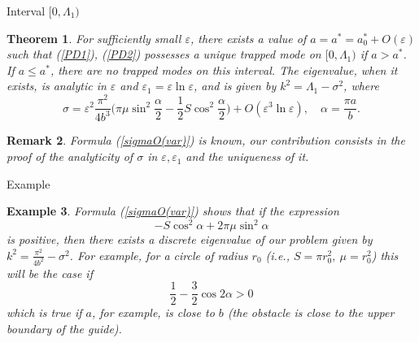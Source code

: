 \documentclass{beamer}
\newtheorem{teo}{Theorem}[section]
\newtheorem{obs}[teo]{Remark}
\newtheorem{exa}[teo]{Example}
\newcommand{\ds}{\displaystyle}
\begin{document}
\begin{frame}{Interval $[0,\Lambda_1)$}
 \begin{teo}\label{sigma_alpha}
For sufficiently small $\varepsilon$, there exists a value of $a=a^{\ast}=a_0^{\ast}+O(\varepsilon)$ such that (\ref{PD1}), (\ref{PD2}) possesses a unique trapped mode on $[0,\Lambda_1)$ if $a>a^{\ast}$. If $a\leq a^{\ast}$, there are no trapped modes on this interval. The eigenvalue, when it exists, is analytic in $\varepsilon$ and $\varepsilon_1=\varepsilon\ln\varepsilon$, and is given by $k^2=\Lambda_1-\sigma^2$, where   
\begin{equation}\label{sigmaO(var)}
\sigma=\varepsilon^2\frac{\pi^2}{4b^3}\Bigg(\pi\mu\sin^2\frac{\alpha}{2}-\frac{1}{2}S \cos^2\frac{\alpha}{2}\Bigg)+O(\varepsilon^3\ln\varepsilon),\quad \alpha=\frac{\pi a}{b}.
\end{equation}
\end{teo}
\begin{obs}
Formula (\ref{sigmaO(var)}) is known, our contribution consists in the proof of the analyticity of $\sigma$ in $\varepsilon, \varepsilon_1$ and the uniqueness of it. 
\end{obs}
\end{frame}
\begin{frame}{Example}
\begin{exa}
Formula (\ref{sigmaO(var)}) shows that if the expression 
\begin{equation*}
-S\cos^2\alpha +2\pi\mu\sin^2\alpha
\end{equation*}
is positive, then there exists a discrete eigenvalue of our problem given by $k^2=\ds\frac{\pi^2}{4b^2}-\sigma^2$. For example, for a circle of radius $r_0$ (i.e., $S=\pi r_0^2,~\mu=r_0^2$) this will be the case if
$$
\ds\frac{1}{2}-\ds\frac{3}{2}\cos2\alpha>0
$$
which is true if $a$, for example, is close to $b$ (the obstacle is close to the upper boundary of the guide). 
\end{exa}
\end{frame}
\end{document}
